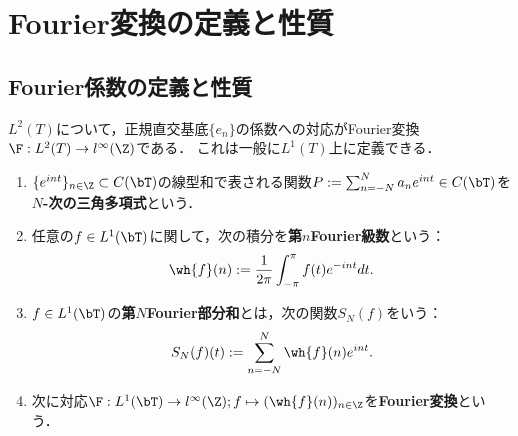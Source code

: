 \documentclass[uplatex,dvipdfmx]{jsreport}
\begin{document}
\section{Fourier変換の定義と性質}

\subsection{Fourier係数の定義と性質}

\begin{tcolorbox}[colframe=ForestGreen, colback=ForestGreen!10!white,breakable,colbacktitle=ForestGreen!40!white,coltitle=black,fonttitle=\bfseries\sffamily,
title=]
    $L^2(T)$について，正規直交基底$\{e_n\}$の係数への対応がFourier変換$\F:L^2(T)\to l^\infty(\Z)$である．
    これは一般に$L^1(T)$上に定義できる．
\end{tcolorbox}

\begin{definition}\mbox{}
    \begin{enumerate}
        \item $\{e^{int}\}_{n\in\Z}\subset C(\bT)$の線型和で表される関数$P:=\sum_{n=-N}^Na_ne^{int}\in C(\bT)$を\textbf{$N$-次の三角多項式}という．
        \item 任意の$f\in L^1(\bT)$に関して，次の積分を\textbf{第$n$Fourier級数}という：
        \[\wh{f}(n):=\frac{1}{2\pi}\int^\pi_{-\pi}f(t)e^{-int}dt.\]
        \item $f\in L^1(\bT)$の\textbf{第$N$Fourier部分和}とは，次の関数$S_N(f)$をいう：
        \[S_N(f)(t):=\sum_{n=-N}^N\wh{f}(n)e^{int}.\]
        \item 次に対応$\F:L^1(\bT)\to l^\infty(\Z);f\mapsto(\wh{f}(n))_{n\in\Z}$を\textbf{Fourier変換}という．
    \end{enumerate}
\end{definition}
\end{document}
